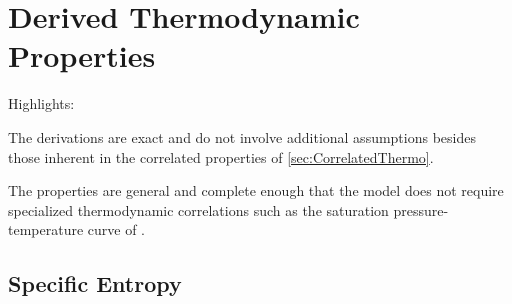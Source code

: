 


\section{Derived Thermodynamic Properties}
\label{sec:DerivedThermo}

\begin{contextbox}
  Highlights:
  \begin{itemize*}
    \item The derivations are exact and do not involve additional assumptions besides those inherent in the correlated properties of \autoref{sec:CorrelatedThermo}.
    \item The properties are general and complete enough that the model does not require specialized thermodynamic correlations such as the saturation pressure-temperature curve of .
  \end{itemize*}
\end{contextbox}
\vspace{0.7\baselineskip}



\subsection{Specific Entropy}
  \label{sec:SpecificEntropy}

